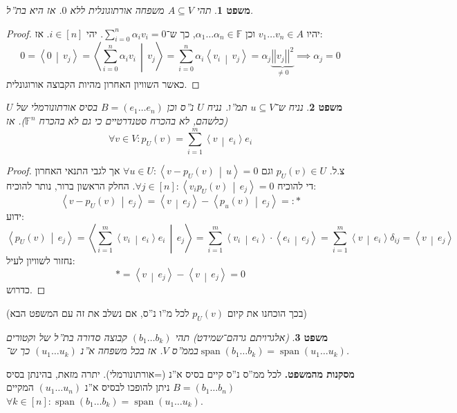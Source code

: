 \documentclass[]{article}
\newcommand\ra    {\rangle}
\newcommand\la    {\langle}
\DeclareMathOperator{\Sp}     {span}
\newcommand\sumni     {\sum_{i = 0}^{n}}
\newcommand\F         {\mathbb{F}}
\newcommand\co        {\colon}
\newcommand\ag        {\alpha}
\newtheorem{Theorem}{משפט}
\theoremstyle{definition}
\newcommand\theo  [1] {\begin{Theorem}#1\end{Theorem}}
\newcommand\norm[1]   {\left \vert \left \vert #1 \right \vert \right \vert}
\newcommand\mut[2]    {\left \la #1 \,\middle\vert\, #2 \right \ra}
\begin{document}
    \theo{תהי $A \subseteq V$ משפחה אורתוגונלית ללא $0$. אז היא בת''ל. }\begin{proof}
        יהיו $v_1 \dots v_n \in A$ וכן $\ag_1 \dots \ag_n \in \F$, כך ש־$\sumni \ag_i v_i = 0$. יהי $i \in [n]$. אז: 
        \[ 0 = \mut{0}{v_j} = \mut{\sumni \ag_i v_i}{v_j} = \sumni \ag_i \mut{v_i}{v_j} = \ag _j \underbrace{\norm{v_j}^2}_{\neq 0} \implies \ag_j = 0 \]
        כאשר השוויון האחרון מהיות הקבוצה אורוגונלית. 
    \end{proof}
    \theo{נניח ש־$u \subseteq V$ תמ''ו. נניח $U$ נ''ס וכן $B = (e_1 \dots e_n)$ בסיס אורתונורמלי של $U$ (כלשהם, לא בהכרח סטנדרטיים כי גם לא בהכרח $\F^n$). אז 
    \[ \forall v \in V \co p_U(v) = \sum_{i = 1}^{m}\mut{v}{e_i}e_i \]}
    \begin{proof}
        צ.ל. $p_U(v) \in U$ וגם $\forall u \in U \co \mut{v - p_U(v)}{u} = 0$ אך לגבי התנאי האחרון די להוכיח $\forall j \in [n] \co \mut{v_i p_U(v)}{e_j}  = 0$. החלק הראשון ברור, נותר להוכיח: 
        \[ \mut{v - p_U(v)}{e_j} = \mut{v}{e_j} - \mut{p_u(v)}{e_j} =: * \]
        ידוע: 
        \[ \mut{p_U(v)}{e_j} = \mut{\sum_{i = 1}^{m}\mut{v_i}{e_i} e_i}{e_j} = \sum_{i = 1}^{m}\mut{v_i}{e_i} \cdot \mut{e_i}{e_j} = \sum_{i = 1}^{m}\mut{v}{e_i}\delta_{ij} = \mut{v}{e_j} \]
        נחזור לשוויון לעיל: 
        \[ *= \mut{v}{e_j} - \mut{v}{e_j} = 0 \]
        כדרוש. 
    \end{proof}
    (בכך הוכחנו את קיום $p_U(v)$ לכל מ''ו נ''ס, אם נשלב את זה עם המשפט הבא)
    
    \theo{(אלגרויתם גרהם־שמידט) תהי $(b_1 \dots b_k)$ קבוצה סדורה בת''ל של וקטורים בממ''ס $V$. אז בכל משפחה א''נ $(u_1 \dots u_k)$ כך ש־$\Sp(b_1 \dots b_k) = \Sp(u_1 \dots u_k)$. }
    \textbf{מסקנות מהמשפט. }לכל ממ''ס נ''ס קיים בסיס א''נ (=אורתונורמלי). יתרה מזאת, בהינתן בסיס $B = (b_1 \dots b_n)$ ניתן להופכו לבסיס א''נ $(u_1 \dots u_n)$ המקיים $\forall k \in [n] \co \Sp (b_1 \dots b_k) = \Sp(u_1 \dots u_k)$. 
    
\end{document}
